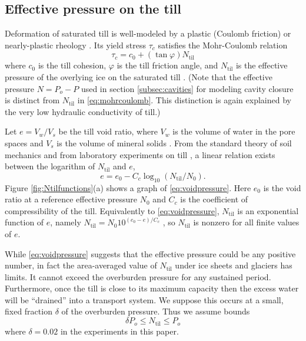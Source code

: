 \documentclass[gmd]{copernicus}   %
\begin{document}
\subsection{Effective pressure on the till} \label{subsec:effectivepressuretill}  Deformation of saturated till is well-modeled by a plastic (Coulomb friction) or nearly-plastic rheology \citep{Hookeetal1997,TrufferHarrisonEchelmeyer2000,Tulaczyketal2000,SchoofTill}.  Its yield stress $\tau_c$ satisfies the Mohr-Coulomb relation
\begin{equation}
\tau_c = c_0 + (\tan \varphi) N_{\text{til}}  \label{eq:mohrcoulomb}
\end{equation}
where $c_0$ is the till cohesion, $\varphi$ is the till friction angle, and $N_{\text{til}}$ is the effective pressure of the overlying ice on the saturated till \citep{CuffeyPaterson}.  (Note that the effective pressure $N=P_o-P$ used in section \ref{subsec:cavities} for modeling cavity closure is distinct from $N_{\text{til}}$ in \eqref{eq:mohrcoulomb}.  This distinction is again explained by the very low hydraulic conductivity of till.)

Let $e = V_w / V_s$ be the till void ratio, where $V_w$ is the volume of water in the pore spaces and $V_s$ is the volume of mineral solids \citep{Tulaczyketal2000}.  From the standard theory of soil mechanics and from laboratory experiments on till \citep{Hookeetal1997,Tulaczyketal2000}, a linear relation exists between the logarithm of $N_{\text{til}}$ and $e$,
\begin{equation}
e = e_0 - C_c \log_{10}\left(N_{\text{til}} / N_0\right).  \label{eq:voidpressure}
\end{equation}
Figure \ref{fig:Ntilfunctions}(a) shows a graph of \eqref{eq:voidpressure}.  Here $e_0$ is the void ratio at a reference effective pressure $N_0$ and $C_c$ is the coefficient of compressibility of the till.  Equivalently to \eqref{eq:voidpressure}, $N_{\text{til}}$ is an exponential function of $e$, namely $N_{\text{til}} = N_0 10^{(e_0 - e)/C_c}$ \citep[equation (15)]{vanderWeletal2013}, so $N_{\text{til}}$ is nonzero for all finite values of $e$.

While \eqref{eq:voidpressure} suggests that the effective pressure could be any positive number, in fact the area-averaged value of $N_{\text{til}}$ under ice sheets and glaciers has limits.  It cannot exceed the overburden pressure for any sustained period.  Furthermore, once the till is close to its maximum capacity then the excess water will be ``drained'' into a transport system.  We suppose this occurs at a small, fixed fraction $\delta$ of the overburden pressure.  Thus we assume bounds
\begin{equation}
\delta P_o \le N_{\text{til}} \le P_o  \label{eq:Ntilbounds}
\end{equation}
where $\delta = 0.02$ in the experiments in this paper.
\end{document}
